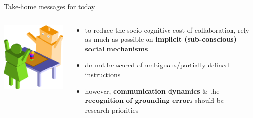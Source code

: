 \documentclass[compress]{beamer}
\begin{document}
\begin{frame}{Take-home messages for today}

    \begin{columns}
        \begin{column}{0.45\linewidth}
            
            \begin{center}
                \includegraphics[width=0.9\linewidth]{joint-action-scenario-completed}
            \end{center}
        \end{column}
        \begin{column}{0.55\linewidth}
            \begin{itemize}
                \item<+-> to reduce the socio-cognitive cost of collaboration, rely as much
                    as possible on {\bf implicit (sub-conscious) social mechanisms}
                \item<+-> do not be scared of ambiguous/partially defined instructions
                \item<+-> however, {\bf communication dynamics} \& the {\bf recognition of grounding
                    errors} should be research priorities
            \end{itemize}

        \end{column}
    \end{columns}
\end{frame}
\end{document}
